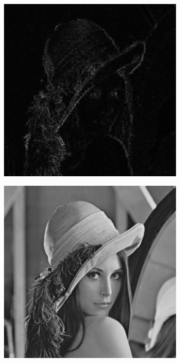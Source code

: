 \begin{figure}[h!]
\begin{subfigure}[b]{0.3\linewidth}
		\caption{}
		\label{fig:7zonal5}
	\end{subfigure}
	\begin{subfigure}[b]{0.3\linewidth}
		\includegraphics[width=\linewidth]{myfigure/p7/7_zonal_5_diff.png}
		\caption{}
		\label{fig:7zonal5diff}
	\end{subfigure}
	\begin{subfigure}[b]{0.3\linewidth}
		\includegraphics[width=\linewidth]{myfigure/p7/lenna.png}

\end{subfigure}
\end{figure}

